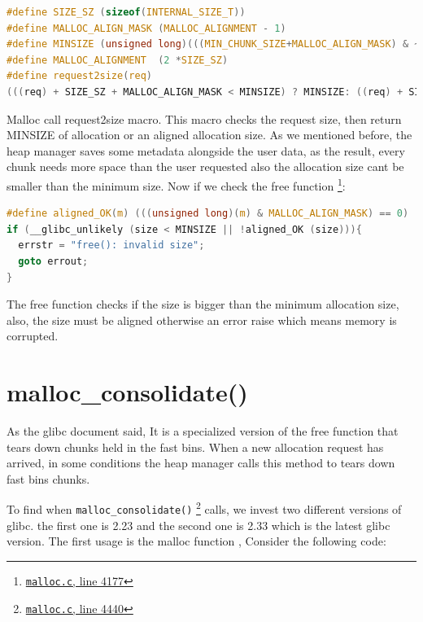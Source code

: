 \documentclass{masterthesis}
\newcommand*\libc{glibc}
\newcommand*\fb{fast bins}
\begin{document}
\begin{lstlisting}[language=c,frame=tlrb]
#define SIZE_SZ (sizeof(INTERNAL_SIZE_T))
#define MALLOC_ALIGN_MASK (MALLOC_ALIGNMENT - 1)
#define MINSIZE (unsigned long)(((MIN_CHUNK_SIZE+MALLOC_ALIGN_MASK) & ~MALLOC_ALIGN_MASK))
#define MALLOC_ALIGNMENT  (2 *SIZE_SZ)
#define request2size(req)
(((req) + SIZE_SZ + MALLOC_ALIGN_MASK < MINSIZE) ? MINSIZE: ((req) + SIZE_SZ + MALLOC_ALIGN_MASK) & ~MALLOC_ALIGN_MASK)
\end{lstlisting}

Malloc call request2size macro. This macro checks the request size, then return MINSIZE of allocation or an aligned allocation size. As we mentioned before, the heap manager saves some metadata alongside the user data, as the result, every chunk needs more space than the user requested also the allocation size cant be smaller than the minimum size. Now if we check the free function \footnote{\href{https://sourceware.org/git/?p=glibc.git;a=blob;f=malloc/malloc.c;h=f7cd29bc2f93e1082ee77800bd64a4b2a2897055;hb=9ea3686266dca3f004ba874745a4087a89682617\#l4177}{\texttt{malloc.c}, line 4177}}:

\begin{lstlisting}[language=c,frame=tlrb]
#define aligned_OK(m) (((unsigned long)(m) & MALLOC_ALIGN_MASK) == 0)
if (__glibc_unlikely (size < MINSIZE || !aligned_OK (size))){
  errstr = "free(): invalid size";
  goto errout;
}
\end{lstlisting}

The free function checks if the size is bigger than the minimum allocation size, also, the size must be aligned otherwise an error raise which means memory is corrupted.

\section{malloc\_consolidate()}
As the \libc{} document said, It is a specialized version of the free function that tears down chunks held in the \fb{}. When a new allocation request has arrived, in some conditions the heap manager calls this method to tears down \fb{} chunks. 

To find when \lstinline{malloc_consolidate()} \footnote{\href{https://sourceware.org/git/?p=glibc.git;a=blob;f=malloc/malloc.c;h=f7cd29bc2f93e1082ee77800bd64a4b2a2897055;hb=9ea3686266dca3f004ba874745a4087a89682617\#l4440}{\texttt{malloc.c}, line 4440}}  calls, we invest two different versions of \libc{}. the first one is 2.23 and the second one is 2.33 which is the latest \libc{} version. The first usage is the malloc function , Consider the following code:
\end{document}
